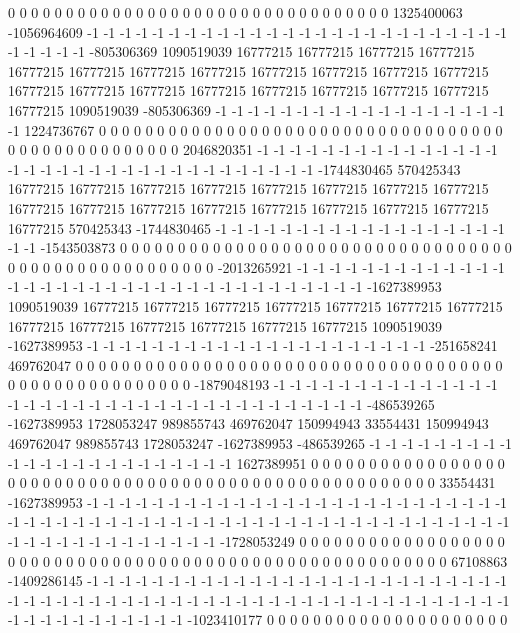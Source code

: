 0 0 0 0 0 0 0 0 0 0 0 0 0 0 0 0 0 0 0 0 0 0 0 0 0 0 0 0 0 0 0 0 0 1325400063 -1056964609 -1 -1 -1 -1 -1 -1 -1 -1 -1 -1 -1 -1 -1 -1 -1 -1 -1 -1 -1 -1 -1 -1 -1 -1 -1 -1 -1 -1 -1 -1 -1 -805306369 1090519039 16777215 16777215 16777215 16777215 16777215 16777215 16777215 16777215 16777215 16777215 16777215 16777215 16777215 16777215 16777215 16777215 16777215 16777215 16777215 16777215 16777215 1090519039 -805306369 -1 -1 -1 -1 -1 -1 -1 -1 -1 -1 -1 -1 -1 -1 -1 -1 -1 -1 -1 1224736767 0 0 0 0 0 0 0 0 0 0 0 0 0 0 0 0 0
0 0 0 0 0 0 0 0 0 0 0 0 0 0 0 0 0 0 0 0 0 0 0 0 0 0 0 0 0 0 0 0 0 2046820351 -1 -1 -1 -1 -1 -1 -1 -1 -1 -1 -1 -1 -1 -1 -1 -1 -1 -1 -1 -1 -1 -1 -1 -1 -1 -1 -1 -1 -1 -1 -1 -1 -1 -1 -1744830465 570425343 16777215 16777215 16777215 16777215 16777215 16777215 16777215 16777215 16777215 16777215 16777215 16777215 16777215 16777215 16777215 16777215 16777215 570425343 -1744830465 -1 -1 -1 -1 -1 -1 -1 -1 -1 -1 -1 -1 -1 -1 -1 -1 -1 -1 -1 -1 -1543503873 0 0 0 0 0 0 0 0 0 0 0 0 0 0 0 0 0 0
0 0 0 0 0 0 0 0 0 0 0 0 0 0 0 0 0 0 0 0 0 0 0 0 0 0 0 0 0 0 0 0 0 0 -2013265921 -1 -1 -1 -1 -1 -1 -1 -1 -1 -1 -1 -1 -1 -1 -1 -1 -1 -1 -1 -1 -1 -1 -1 -1 -1 -1 -1 -1 -1 -1 -1 -1 -1 -1 -1 -1627389953 1090519039 16777215 16777215 16777215 16777215 16777215 16777215 16777215 16777215 16777215 16777215 16777215 16777215 16777215 1090519039 -1627389953 -1 -1 -1 -1 -1 -1 -1 -1 -1 -1 -1 -1 -1 -1 -1 -1 -1 -1 -1 -1 -1 -251658241 469762047 0 0 0 0 0 0 0 0 0 0 0 0 0 0 0 0 0 0
0 0 0 0 0 0 0 0 0 0 0 0 0 0 0 0 0 0 0 0 0 0 0 0 0 0 0 0 0 0 0 0 0 0 0 -1879048193 -1 -1 -1 -1 -1 -1 -1 -1 -1 -1 -1 -1 -1 -1 -1 -1 -1 -1 -1 -1 -1 -1 -1 -1 -1 -1 -1 -1 -1 -1 -1 -1 -1 -1 -1 -1 -486539265 -1627389953 1728053247 989855743 469762047 150994943 33554431 150994943 469762047 989855743 1728053247 -1627389953 -486539265 -1 -1 -1 -1 -1 -1 -1 -1 -1 -1 -1 -1 -1 -1 -1 -1 -1 -1 -1 -1 -1 -1 -1 1627389951 0 0 0 0 0 0 0 0 0 0 0 0 0 0 0 0 0 0 0
0 0 0 0 0 0 0 0 0 0 0 0 0 0 0 0 0 0 0 0 0 0 0 0 0 0 0 0 0 0 0 0 0 0 0 33554431 -1627389953 -1 -1 -1 -1 -1 -1 -1 -1 -1 -1 -1 -1 -1 -1 -1 -1 -1 -1 -1 -1 -1 -1 -1 -1 -1 -1 -1 -1 -1 -1 -1 -1 -1 -1 -1 -1 -1 -1 -1 -1 -1 -1 -1 -1 -1 -1 -1 -1 -1 -1 -1 -1 -1 -1 -1 -1 -1 -1 -1 -1 -1 -1 -1 -1 -1 -1 -1 -1 -1 -1 -1728053249 0 0 0 0 0 0 0 0 0 0 0 0 0 0 0 0 0 0 0 0
0 0 0 0 0 0 0 0 0 0 0 0 0 0 0 0 0 0 0 0 0 0 0 0 0 0 0 0 0 0 0 0 0 0 0 0 67108863 -1409286145 -1 -1 -1 -1 -1 -1 -1 -1 -1 -1 -1 -1 -1 -1 -1 -1 -1 -1 -1 -1 -1 -1 -1 -1 -1 -1 -1 -1 -1 -1 -1 -1 -1 -1 -1 -1 -1 -1 -1 -1 -1 -1 -1 -1 -1 -1 -1 -1 -1 -1 -1 -1 -1 -1 -1 -1 -1 -1 -1 -1 -1 -1 -1 -1 -1 -1 -1 -1 -1023410177 0 0 0 0 0 0 0 0 0 0 0 0 0 0 0 0 0 0 0 0 0
